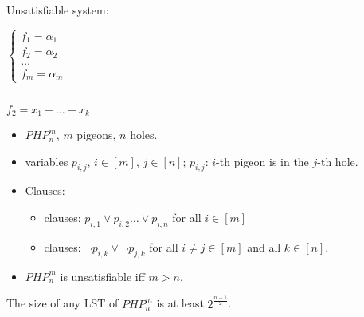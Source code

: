 {%

}

{
\begin{columns}
\begin{column}{1cm}
Unsatisfiable system:

$\left\{ \begin{aligned}
f_1=\alpha_1 \\
f_2=\alpha_2 \\
\dots\\
f_m=\alpha_m
\end{aligned}\right.$


\end{column}


\begin{column}{9cm}

\end{column}
\end{columns}

$f_2=x_1+\dots+x_k$
}

{
\begin{itemize}
\item $PHP^m_n$, $m$ pigeons, $n$ holes. 
\item variables $p_{i, j}$, $i \in [m]$, $j \in [n]$; 
$p_{i, j}$: $i$-th pigeon is in the $j$-th hole.
\item Clauses: 
\begin{itemize}
\item {} clauses: 
$p_{i, 1} \lor p_{i, 2} \dots \lor p_{i, n}$ for all $i \in [m]$
\item {} clauses: $\lnot p_{i, k} \lor \lnot p_{j, k}$ for all $i \neq j
\in [m]$ and all $k \in [n]$.
\end{itemize}
\item $PHP^m_n$ is unsatisfiable iff $m>n$.

\end{itemize}
\pause \myth The size of any LST of $PHP^m_n$ is at least $2^{\frac{n-1}{2}}$.
}

